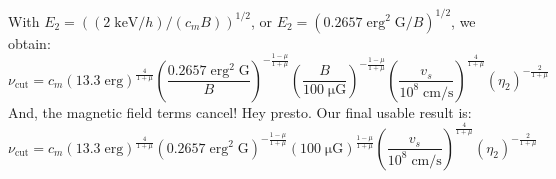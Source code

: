 \documentclass[iop, apj, numberedappendix]{emulateapj}
\newcommand*{\mt}{\mathrm}
\newcommand*{\unit}[1]{\;\mt{#1}}  %
\newcommand*{\mE}{m_\mt{E}}
\newcommand*{\muG}{\unit{\mu G}}
\begin{document}
With $E_2 = \left( (2 \unit{keV}/h) / (c_m B) \right)^{1/2}$, or
$E_2 = \left( 0.2657 \unit{erg^2\;G} / B \right)^{1/2}$, we obtain:
\[
    \nu_{\mt{cut}} = c_m
        \left( 13.3 \unit{erg} \right)^{\frac{4}{1+\mu}}
        \left( \frac{0.2657 \unit{erg^2\;G}}{B} \right)^{-\frac{1-\mu}{1+\mu}}
        \left( \frac{B}{100\muG} \right)^{-\frac{1-\mu}{1+\mu}}
        \left( \frac{v_s}{10^8 \unit{cm/s}} \right)^{\frac{4}{1+\mu}}
        \left( \eta_2 \right)^{-\frac{2}{1+\mu}}
\]
And, the magnetic field terms cancel!  Hey presto.
Our final usable result is:
\begin{equation}
    \nu_{\mt{cut}} = c_m
        \left( 13.3 \unit{erg} \right)^{\frac{4}{1+\mu}}
        \left( 0.2657 \unit{erg^2\;G} \right)^{-\frac{1-\mu}{1+\mu}}
        \left( 100 \muG \right)^{\frac{1-\mu}{1+\mu}}
        \left( \frac{v_s}{10^8 \unit{cm/s}} \right)^{\frac{4}{1+\mu}}
        \left( \eta_2 \right)^{-\frac{2}{1+\mu}}
\end{equation}

%
%
%
%    
%
%    
%
%    



\end{document}
